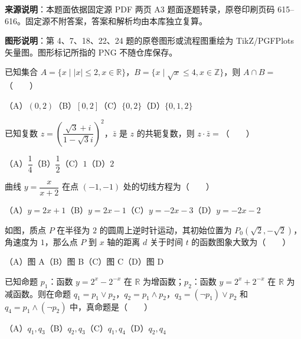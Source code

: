 


\begin{gktip}
\textbf{来源说明}：本题面依据固定源 PDF 两页 A3 题面逐题转录，原卷印刷页码 615–616。固定源不附答案，答案和解析均由本库独立复算。

\textbf{图形说明}：第 4、7、18、22、24 题的原卷图形或流程图重绘为 TikZ/PGFPlots 矢量图。图形标记所指的 PNG 不随仓库保存。
\end{gktip}


\begin{question}
已知集合 $A=\{x\mid |x|\leq2, x\in\mathbb R\}$，$B=\{x\mid \sqrt{x}\leq4, x\in\mathbb Z\}$，则 $A\cap B=$\mbox{（　　）}

（A）$(0,2)$\quad（B）$[0,2]$\quad（C）$\{0,2\}$\quad（D）$\{0,1,2\}$

\end{question}
\begin{question}
已知复数 $z=\left(\dfrac{\sqrt3+i}{1-\sqrt3i}\right)^2$，$\bar z$ 是 $z$ 的共轭复数，则 $z\cdot\bar z=$\mbox{（　　）}

（A）$\dfrac14$\quad（B）$\dfrac12$\quad（C）$1$\quad（D）$2$

\end{question}
\begin{question}
曲线 $y=\dfrac{x}{x+2}$ 在点 $(-1,-1)$ 处的切线方程为\mbox{（　　）}

（A）$y=2x+1$\quad（B）$y=2x-1$\quad（C）$y=-2x-3$\quad（D）$y=-2x-2$

\Needspace{0.4\textheight}
\end{question}
\begin{question}
如图，质点 $P$ 在半径为 $2$ 的圆周上逆时针运动，其初始位置为 $P_0(\sqrt2,-\sqrt2)$，角速度为 $1$，那么点 $P$ 到 $x$ 轴的距离 $d$ 关于时间 $t$ 的函数图象大致为\mbox{（　　）}
\nopagebreak[4]
\begin{center}\end{center}
\nopagebreak[4]
（A）图 A\quad（B）图 B\quad（C）图 C\quad（D）图 D

\end{question}
\begin{question}
已知命题 $p_1$：函数 $y=2^x-2^{-x}$ 在 $\mathbb R$ 为增函数；$p_2$：函数 $y=2^x+2^{-x}$ 在 $\mathbb R$ 为减函数。则在命题 $q_1=p_1\lor p_2$，$q_2=p_1\land p_2$，$q_3=(\lnot p_1)\lor p_2$ 和 $q_4=p_1\land(\lnot p_2)$ 中，真命题是\mbox{（　　）}

（A）$q_1,q_3$\quad（B）$q_2,q_3$\quad（C）$q_1,q_4$\quad（D）$q_2,q_4$

\end{question}
